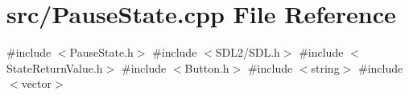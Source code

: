 \section{src/\+Pause\+State.cpp File Reference}
\label{_pause_state_8cpp}
{\ttfamily \#include $<$Pause\+State.\+h$>$}\newline
{\ttfamily \#include $<$S\+D\+L2/\+S\+D\+L.\+h$>$}\newline
{\ttfamily \#include $<$State\+Return\+Value.\+h$>$}\newline
{\ttfamily \#include $<$Button.\+h$>$}\newline
{\ttfamily \#include $<$string$>$}\newline
{\ttfamily \#include $<$vector$>$}\newline

